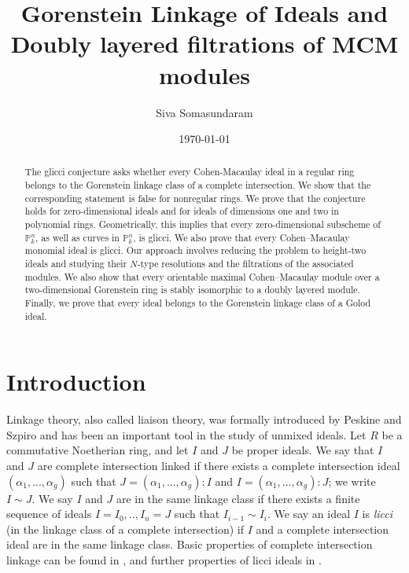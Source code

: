 \documentclass[11pt,letterpaper]{amsart}
\date{\today}
\title{Gorenstein Linkage of Ideals and Doubly layered filtrations of MCM modules}
\author{Siva Somasundaram}
\date{}
\theoremstyle{plain}
\theoremstyle{definition}
\theoremstyle{remark}
\begin{document}
\begin{abstract} \noindent The glicci conjecture asks whether every Cohen-Macaulay ideal in a regular ring belongs to the Gorenstein linkage class of a complete intersection. We show that the corresponding statement is false for nonregular rings. We prove that the conjecture holds for zero-dimensional ideals and for ideals of dimensions one and two in polynomial rings. Geometrically, this implies that every zero-dimensional subscheme of \(\mathbb P^n_k\), as well as curves in \(\mathbb P^n_k\), is glicci. We also prove that every Cohen–Macaulay monomial ideal is glicci. Our approach involves reducing the problem to height-two ideals and studying their \(N\)-type resolutions and the filtrations of the associated modules. We also show that every orientable maximal Cohen–Macaulay module over a two-dimensional Gorenstein ring is stably isomorphic to a doubly layered module. Finally, we prove that every ideal belongs to the Gorenstein linkage class of a Golod ideal.
\end{abstract}

\begingroup \maketitle \footnotesize \tableofcontents \endgroup



\section{ Introduction}
Linkage theory, also called liaison theory, was formally introduced by Peskine and Szpiro \cite{peskine1974liaison} and has been an important tool in the study of unmixed ideals. Let $R$ be a commutative Noetherian ring, and let $I$ and $J$ be proper ideals. We say that $I$ and $J$ are complete intersection linked if there exists a complete intersection ideal $(\alpha_1,...,\alpha_g)$ such that $J=(\alpha_1,...,\alpha_g):I$ and $I=(\alpha_1,...,\alpha_g):J$; we write $I\sim J$. We say $I$ and $J$ are in the same linkage class if there exists a finite sequence of ideals $I=I_0,..,I_n=J$ such that $I_{i-1}\sim I_{i}$. We say an ideal $I$ is \emph{licci} (in the linkage class of a complete intersection) if $I$ and a complete intersection ideal are in the same linkage class. Basic properties of complete intersection linkage can be found in \cite{peskine1974liaison}, and further properties of licci ideals in \cite{huneke1987structure, ulrich1987theory}.
\end{document}
